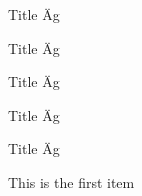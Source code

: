 \documentclass[a4paper, 10pt]{extarticle}
\begin{document}
\lipsum[1]
\begin{fancyblock}[blue]{}
\end{fancyblock}
\lipsum[1]

\newpage

\lipsum[1]
\begin{fancyblock}[blue]{}
\lipsum[1]
\end{fancyblock}
\lipsum[1]

\newpage

\lipsum[1]
\begin{fancyblock}[blue]{Title \"Ag}
\lipsum[1]
\end{fancyblock}
\lipsum[1]
\begin{fancyblock*}[blue]{Title \"Ag}
\lipsum[1]
\end{fancyblock*}
\lipsum[1]
\begin{fancyblock+}[blue]{Title \"Ag}
\lipsum[1]
\end{fancyblock+}
\lipsum[1]

\begin{tcolorbox}[title = {Title \"Ag}]
\lipsum[1]
\end{tcolorbox}

\newpage

\lipsum[1]
\begin{fancyblock}[blue]{Title \"Ag}
\lipsum[1]
\end{fancyblock}
\lipsum[1]

\newpage

\lipsum[1]
\begin{fancyblock}[blue]{Title \"Ag}
\lipsum[1]
\begin{fancylist}
\item This is the first item
\end{fancylist}
\lipsum[1]
\end{fancyblock}
\lipsum[1]

\newpage
\end{document}
